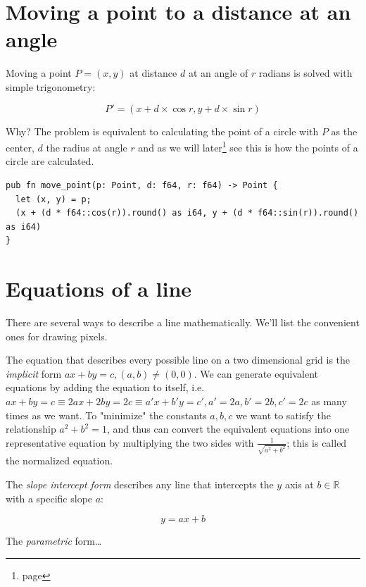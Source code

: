 \documentclass[12pt,openany,a4,usenames,dvipsnames]{book}
\newcommand\pixels{{\pixelfont{}pixels}}
\begin{document}
\chapter{Moving a point to a distance at an angle}

Moving a point $P=(x,y)$ at distance $d$ at an angle of $r$ radians is solved with simple trigonometry:

$$P'=(x+d\times{}\cos{}r, y+d\times{}\sin{}r)$$

Why? The problem is equivalent to calculating the point of a circle with $P$ as the center, $d$ the radius at angle $r$ and as we will later\footnote{\emph{} page \pageref{ch:equations-circles}} see this is how the points of a circle are calculated.

\begin{verbatim}
pub fn move_point(p: Point, d: f64, r: f64) -> Point {
  let (x, y) = p;
  (x + (d * f64::cos(r)).round() as i64, y + (d * f64::sin(r)).round() as i64)
}
\end{verbatim}

\chapter{Equations of a line}\label{ch:equations-lines}
There are several ways to describe a line mathematically. We'll list the convenient ones for drawing \pixels{}.

The equation that describes every possible line on a two dimensional grid is the \emph{implicit} form $ax+by=c, (a,b) \neq{} (0,0)$. We can generate equivalent equations by adding the equation to itself, i.e.\ $ax+by=c \equiv 2ax+2by=2c \equiv a'x+b'y=c', a'=2a, b'=2b, c'=2c$ as many times as we want. To "minimize" the constants $a,b,c$ we want to satisfy the relationship $a^{2}+b^{2}=1$, and thus can convert the equivalent equations into one representative equation by multiplying the two sides with $\frac{1}{\sqrt{a^2+b^2}}$; this is called the normalized equation. %

The \emph{slope intercept form} describes any line that intercepts the $y$ axis at $b \in{} \mathbb{R}$ with a specific slope $a$:

$$y=ax+b$$

The \emph{parametric} form\ldots{} %
\end{document}
